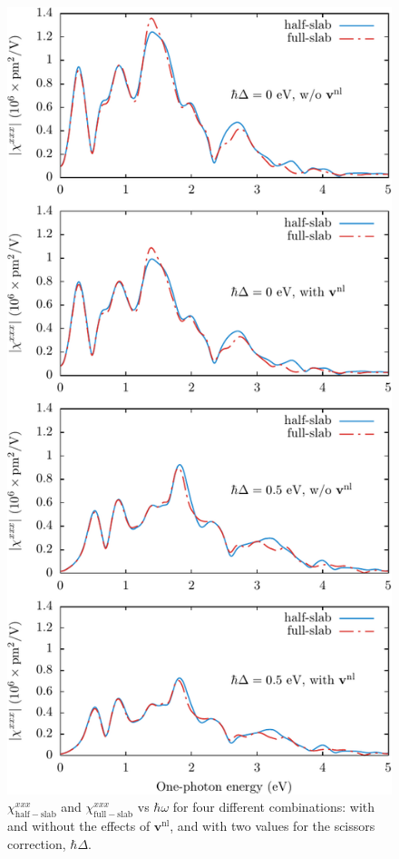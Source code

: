 \begin{figure}[H]
\centering 
\includegraphics[height=0.9\textheight]{content/figures/fig-Si2x1-hsvsfs}
\caption{$\chi^{xxx}_{\mathrm{half-slab}}$ and $\chi^{xxx}_{\mathrm{full-slab}}$
vs $\hbar\omega$ for four different combinations: with and without the effects
of $\mathbf{v}^\mathrm{nl}$, and with two values for the scissors correction,
$\hbar\Delta$.}
\label{fig:hsvfs}
\end{figure}


